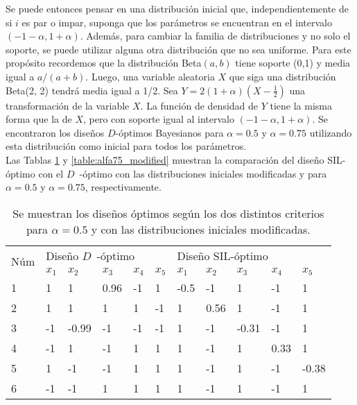 Se puede entonces pensar en una distribución inicial que, independientemente de si $i$ es par o impar, suponga que los parámetros se encuentran en el intervalo $(-1 - \alpha, 1 + \alpha)$. Además, para cambiar la familia de distribuciones y no solo el soporte, se puede utilizar alguna otra distribución que no sea uniforme. Para este propósito recordemos que la distribución Beta$(a, b)$ tiene soporte (0,1) y media igual a $a / (a + b)$. Luego, una variable aleatoria $X$ que siga una distribución Beta(2, 2) tendrá media igual a 1/2. Sea $Y = 2 (1 + \alpha) (X - \frac{1}{2})$ una transformación de la variable $X$. La función de densidad de $Y$ tiene la misma forma que la de $X$, pero con soporte igual al intervalo $(-1 - \alpha, 1 + \alpha)$. Se encontraron los diseños $D$-óptimos Bayesianos para $\alpha = 0.5$ y $\alpha = 0.75$ utilizando esta distribución como inicial para todos los parámetros. \\



Las Tablas \ref{table:alfa5_modified} y \ref{table:alfa75_modified} muestran la comparación del diseño SIL-óptimo con el $D$~-óptimo con las distribuciones iniciales modificadas y para $\alpha = 0.5$ y $\alpha = 0.75$, respectivamente. \\


\begin{table}[h]
\small
\centering
\begin{tabular}{l|lllll|lllll}
\multirow{2}{*}{Núm} & \multicolumn{5}{l|}{ \hspace{1.2cm} Diseño $D$~-óptimo} & \multicolumn{5}{l}{  \hspace{1cm}  Diseño SIL-óptimo}  \\
                     & $x_1$  & $x_2$ & $x_3$ & $x_4$ & $x_5$ & $x_1$ & $x_2$ & $x_3$ & $x_4$ & $x_5$  \\ \hline
1                    & 1  & 1    & 0.96     & -1    & 1     & -0.5  & -1    & 1     & -1    & 1      \\
2                    & 1      & 1  & 1     & 1    & -1     & 1     & 0.56  & 1     & -1    & 1      \\
3                    & -1      & -0.99    & -1  & -1    & -1     & 1     & -1    & -0.31 & -1    & 1      \\
4                    & -1      & 1    & -1     & 1  & 1     & 1     & -1    & 1     & 0.33  & 1      \\
5                    & 1      & -1    & -1     & 1    & 1 & 1     & -1    & 1     & -1    & -0.38 \\
6                    & -1      & -1    & 1     & 1    & 1     & 1     & -1    & 1     & -1    & 1     
\end{tabular}
\caption{Se muestran los diseños óptimos según los dos distintos criterios para $\alpha = 0.5$ y con las distribuciones iniciales modificadas.}
\label{table:alfa5_modified}
\end{table}



